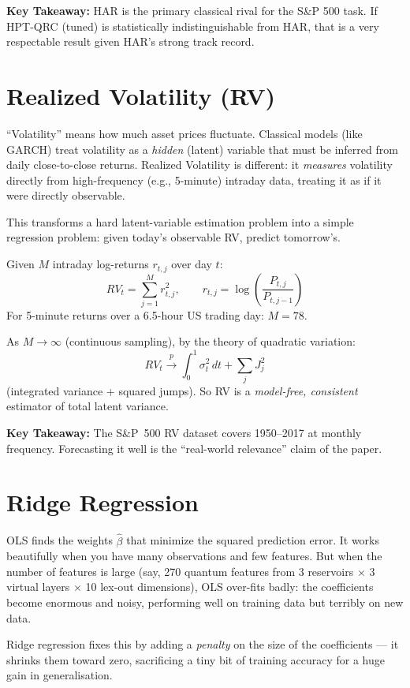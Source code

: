 \documentclass[11pt]{article}
\newcommand{\concept}[2]{%
  \begin{tcolorbox}[conceptbox, title={#1}]
  #2
  \end{tcolorbox}
}
\newcommand{\mathblock}[2]{%
  \begin{tcolorbox}[mathbox, title={Math: #1}]
  #2
  \end{tcolorbox}
}
\newcommand{\keypoint}[1]{%
  \begin{tcolorbox}[keybox]
  \textbf{Key Takeaway:} #1
  \end{tcolorbox}
}
\begin{document}
\keypoint{HAR is the primary classical rival for the S\&P 500 task. If
HPT-QRC (tuned) is statistically indistinguishable from HAR, that is a very
respectable result given HAR's strong track record.}

\section{Realized Volatility (RV)}

\concept{What is Realized Volatility?}{
``Volatility'' means how much asset prices fluctuate. Classical models
(like GARCH) treat volatility as a \emph{hidden} (latent) variable that
must be inferred from daily close-to-close returns. Realized Volatility is
different: it \emph{measures} volatility directly from high-frequency
(e.g., 5-minute) intraday data, treating it as if it were directly
observable.

This transforms a hard latent-variable estimation problem into a simple
regression problem: given today's observable RV, predict tomorrow's.
}

\mathblock{RV Formula}{
Given $M$ intraday log-returns $r_{t,j}$ over day $t$:
\[
  RV_t = \sum_{j=1}^{M} r_{t,j}^2,
  \qquad r_{t,j} = \log\!\left(\frac{P_{t,j}}{P_{t,j-1}}\right)
\]
For 5-minute returns over a 6.5-hour US trading day: $M = 78$.

As $M \to \infty$ (continuous sampling), by the theory of quadratic variation:
\[
  RV_t \xrightarrow{p} \int_0^1 \sigma^2_t \, dt + \sum_j J_j^2
\]
(integrated variance + squared jumps). So RV is a
\emph{model-free, consistent} estimator of total latent variance.
}

\keypoint{The S\&P~500 RV dataset covers 1950--2017 at monthly frequency.
Forecasting it well is the ``real-world relevance'' claim of the paper.}

\section{Ridge Regression}

\concept{Why Not Just Use Ordinary Least Squares (OLS)?}{
OLS finds the weights $\hat\beta$ that minimize the squared prediction error.
It works beautifully when you have many observations and few features. But when
the number of features is large (say, 270 quantum features from 3 reservoirs
$\times$ 3 virtual layers $\times$ 10 lex-out dimensions), OLS over-fits
badly: the coefficients become enormous and noisy, performing well on training
data but terribly on new data.

Ridge regression fixes this by adding a \emph{penalty} on the size of the
coefficients --- it shrinks them toward zero, sacrificing a tiny bit of
training accuracy for a huge gain in generalisation.
}
\end{document}
